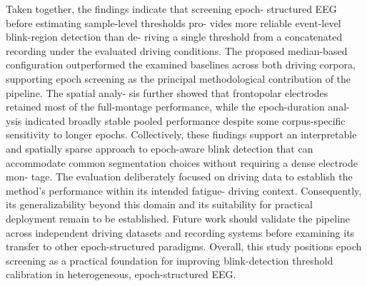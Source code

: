 Taken together, the findings indicate that screening epoch-
structured EEG before estimating sample-level thresholds pro-
vides more reliable event-level blink-region detection than de-
riving a single threshold from a concatenated recording under
the evaluated driving conditions. The proposed median-based
configuration outperformed the examined baselines across both
driving corpora, supporting epoch screening as the principal
methodological contribution of the pipeline. The spatial analy-
sis further showed that frontopolar electrodes retained most of
the full-montage performance, while the epoch-duration anal-
ysis indicated broadly stable pooled performance despite some
corpus-specific sensitivity to longer epochs. Collectively, these
findings support an interpretable and spatially sparse approach to epoch-aware blink detection that can accommodate common
segmentation choices without requiring a dense electrode mon-
tage. The evaluation deliberately focused on driving data to establish the method’s performance within its intended fatigue-
driving context. Consequently, its generalizability beyond this
domain and its suitability for practical deployment remain to
be established. Future work should validate the pipeline across
independent driving datasets and recording systems before
examining its transfer to other epoch-structured paradigms.
Overall, this study positions epoch screening as a practical
foundation for improving blink-detection threshold calibration
in heterogeneous, epoch-structured EEG.